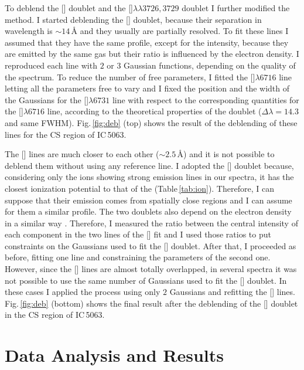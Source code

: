 \documentclass[../thesis.tex]{subfiles}
\begin{document}
To deblend the [] doublet and the []$\lambda\lambda3726,3729$ doublet I further modified the method.
I started deblending the [] doublet, because their separation in wavelength is $\sim 14\,\si{\angstrom}$ and they usually are partially resolved.
To fit these lines I assumed that they have the same profile, except for the intensity, because they are emitted by the same gas but their ratio is influenced by the electron density.
I reproduced each line with $2$ or $3$ Gaussian functions, depending on the quality of the spectrum.
To reduce the number of free parameters, I fitted the []$\lambda6716$ line letting all the parameters free to vary and I fixed the position and the width of the Gaussians for the []$\lambda6731$ line with respect to the corresponding quantities for the []$\lambda6716$ line, according to the theoretical properties of the doublet ($\Delta \lambda = 14.3$ and same FWHM).
Fig.\,\ref{fig:deb} (top) shows the result of the deblending of these lines for the CS region of IC\,5063.

The [] lines are much closer to each other ($\sim 2.5$\,\AA) and it is not possible to deblend them without using any reference line.
I adopted the [] doublet because, considering only the ions showing strong emission lines in our spectra, it has the closest ionization potential to that of the  (Table\,\ref{tab:ion}).
Therefore, I can suppose that their emission comes from spatially close regions and I can assume for them a similar profile.
The two doublets also depend on the electron density in a similar way \citep[see][]{OsterbrockAGN}.
Therefore, I measured the ratio between the central intensity of each component in the two lines of the [] fit and I used those ratios to put constraints on the Gaussians used to fit the [] doublet.
After that, I proceeded as before, fitting one line and constraining the parameters of the second one.
However, since the [] lines are almost totally overlapped, in several spectra it was not possible to use the same number of Gaussians used to fit the [] doublet.
In these cases I applied the process using only $2$ Gaussians and refitting the [] lines.
Fig.\,\ref{fig:deb} (bottom) shows the final result after the deblending of the [] doublet in the CS region of IC\,5063.


\section{Data Analysis and Results}
\label{sec:data_an}
\end{document}

